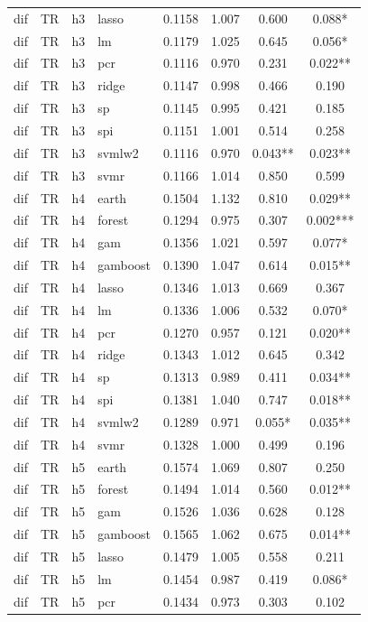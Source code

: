 \begin{ThreePartTable}
\begin{longtable}[t]{llclcccc}
dif & TR & h3 & lasso & 0.1158 & 1.007 & 0.600 & 0.088*\\
dif & TR & h3 & lm & 0.1179 & 1.025 & 0.645 & 0.056*\\
dif & TR & h3 & pcr & 0.1116 & 0.970 & 0.231 & 0.022**\\
dif & TR & h3 & ridge & 0.1147 & 0.998 & 0.466 & 0.190\\
dif & TR & h3 & sp & 0.1145 & 0.995 & 0.421 & 0.185\\
dif & TR & h3 & spi & 0.1151 & 1.001 & 0.514 & 0.258\\
dif & TR & h3 & svmlw2 & 0.1116 & 0.970 & 0.043** & 0.023**\\
dif & TR & h3 & svmr & 0.1166 & 1.014 & 0.850 & 0.599\\
\addlinespace
dif & TR & h4 & earth & 0.1504 & 1.132 & 0.810 & 0.029**\\
dif & TR & h4 & forest & 0.1294 & 0.975 & 0.307 & 0.002***\\
dif & TR & h4 & gam & 0.1356 & 1.021 & 0.597 & 0.077*\\
dif & TR & h4 & gamboost & 0.1390 & 1.047 & 0.614 & 0.015**\\
dif & TR & h4 & lasso & 0.1346 & 1.013 & 0.669 & 0.367\\
dif & TR & h4 & lm & 0.1336 & 1.006 & 0.532 & 0.070*\\
dif & TR & h4 & pcr & 0.1270 & 0.957 & 0.121 & 0.020**\\
dif & TR & h4 & ridge & 0.1343 & 1.012 & 0.645 & 0.342\\
dif & TR & h4 & sp & 0.1313 & 0.989 & 0.411 & 0.034**\\
dif & TR & h4 & spi & 0.1381 & 1.040 & 0.747 & 0.018**\\
dif & TR & h4 & svmlw2 & 0.1289 & 0.971 & 0.055* & 0.035**\\
dif & TR & h4 & svmr & 0.1328 & 1.000 & 0.499 & 0.196\\
\addlinespace
dif & TR & h5 & earth & 0.1574 & 1.069 & 0.807 & 0.250\\
dif & TR & h5 & forest & 0.1494 & 1.014 & 0.560 & 0.012**\\
dif & TR & h5 & gam & 0.1526 & 1.036 & 0.628 & 0.128\\
dif & TR & h5 & gamboost & 0.1565 & 1.062 & 0.675 & 0.014**\\
dif & TR & h5 & lasso & 0.1479 & 1.005 & 0.558 & 0.211\\
dif & TR & h5 & lm & 0.1454 & 0.987 & 0.419 & 0.086*\\
dif & TR & h5 & pcr & 0.1434 & 0.973 & 0.303 & 0.102\\

\end{longtable}
\end{ThreePartTable}
